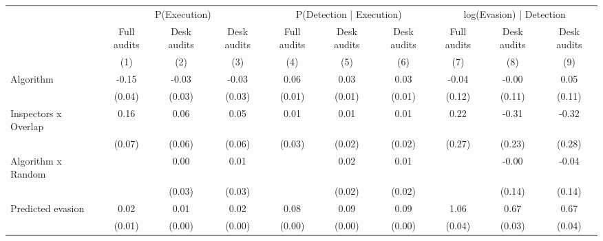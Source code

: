 \begin{tabular}{lccc|ccc|ccc} \toprule
\multicolumn{1}{l}{} & \multicolumn{3}{c}{P(Execution)} & \multicolumn{3}{c}{P(Detection | Execution)} & \multicolumn{3}{c}{log(Evasion) | Detection} \\\cmidrule(lr){2-4}\cmidrule(lr){5-7}\cmidrule(lr){8-10} \multicolumn{1}{l}{} & Full audits & Desk audits & Desk audits & Full audits & Desk audits & Desk audits & Full audits & Desk audits & Desk audits \\ \multicolumn{1}{l}{} & (1) & (2) & (3) & (4) & (5) & (6) & (7) & (8) & (9) \\ \midrule
Algorithm   &       -0.15\sym{***}&       -0.03         &       -0.03         &        0.06\sym{***}&        0.03\sym{***}&        0.03\sym{***}&       -0.04         &       -0.00         &        0.05         \\
            &      (0.04)         &      (0.03)         &      (0.03)         &      (0.01)         &      (0.01)         &      (0.01)         &      (0.12)         &      (0.11)         &      (0.11)         \\
\addlinespace
Inspectors x Overlap&        0.16\sym{**} &        0.06         &        0.05         &        0.01         &        0.01         &        0.01         &        0.22         &       -0.31         &       -0.32         \\
            &      (0.07)         &      (0.06)         &      (0.06)         &      (0.03)         &      (0.02)         &      (0.02)         &      (0.27)         &      (0.23)         &      (0.28)         \\
\addlinespace
Algorithm x Random&                     &        0.00         &        0.01         &                     &        0.02         &        0.01         &                     &       -0.00         &       -0.04         \\
            &                     &      (0.03)         &      (0.03)         &                     &      (0.02)         &      (0.02)         &                     &      (0.14)         &      (0.14)         \\
\addlinespace
Predicted evasion&        0.02\sym{***}&        0.01\sym{***}&        0.02\sym{***}&        0.08\sym{***}&        0.09\sym{***}&        0.09\sym{***}&        1.06\sym{***}&        0.67\sym{***}&        0.67\sym{***}\\
            &      (0.01)         &      (0.00)         &      (0.00)         &      (0.00)         &      (0.00)         &      (0.00)         &      (0.04)         &      (0.03)         &      (0.04)         \\

\end{tabular}
